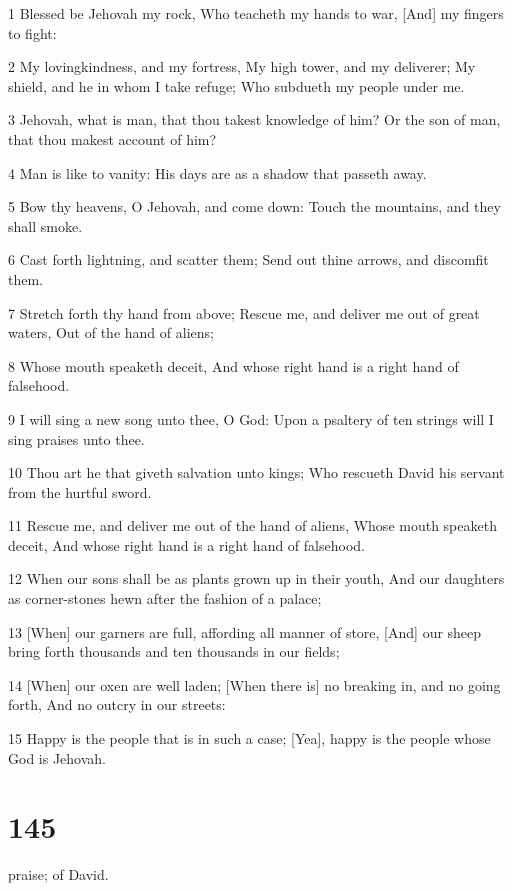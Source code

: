 \par 1 Blessed be Jehovah my rock, Who teacheth my hands to war, [And] my fingers to fight:
\par 2 My lovingkindness, and my fortress, My high tower, and my deliverer; My shield, and he in whom I take refuge; Who subdueth my people under me.
\par 3 Jehovah, what is man, that thou takest knowledge of him? Or the son of man, that thou makest account of him?
\par 4 Man is like to vanity: His days are as a shadow that passeth away.
\par 5 Bow thy heavens, O Jehovah, and come down: Touch the mountains, and they shall smoke.
\par 6 Cast forth lightning, and scatter them; Send out thine arrows, and discomfit them.
\par 7 Stretch forth thy hand from above; Rescue me, and deliver me out of great waters, Out of the hand of aliens;
\par 8 Whose mouth speaketh deceit, And whose right hand is a right hand of falsehood.
\par 9 I will sing a new song unto thee, O God: Upon a psaltery of ten strings will I sing praises unto thee.
\par 10 Thou art he that giveth salvation unto kings; Who rescueth David his servant from the hurtful sword.
\par 11 Rescue me, and deliver me out of the hand of aliens, Whose mouth speaketh deceit, And whose right hand is a right hand of falsehood.
\par 12 When our sons shall be as plants grown up in their youth, And our daughters as corner-stones hewn after the fashion of a palace;
\par 13 [When] our garners are full, affording all manner of store, [And] our sheep bring forth thousands and ten thousands in our fields;
\par 14 [When] our oxen are well laden; [When there is] no breaking in, and no going forth, And no outcry in our streets:
\par 15 Happy is the people that is in such a case; [Yea], happy is the people whose God is Jehovah.

\chapter{145}

\par [A] [Psalm] [of] praise; of David.

